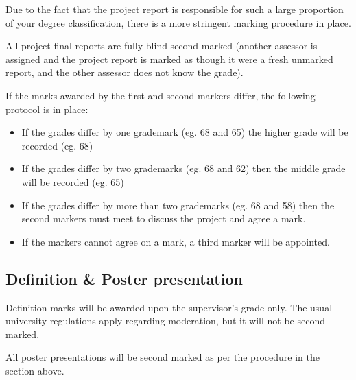 Due to the fact that the project report is responsible for such a large proportion of your degree classification, there is a more stringent marking procedure in place.

All project final reports are fully blind second marked (another assessor is assigned and the project report is marked as though it were a fresh unmarked report, and the other assessor does not know the grade).

If the marks awarded by the first and second markers differ, the following protocol is in place:

\begin{itemize}
    \item If the grades differ by one grademark (eg. 68 and 65) the higher grade will be recorded (eg. 68)
    \item If the grades differ by two grademarks (eg. 68 and 62) then the middle grade will be recorded (eg. 65)
    \item If the grades differ by more than two grademarks (eg. 68 and 58) then the second markers must meet to discuss the project and agree a mark.
    \item If the markers cannot agree on a mark, a third marker will be appointed.
\end{itemize}

\subsection{Definition \& Poster presentation}

Definition marks will be awarded upon the supervisor's grade only. The usual university regulations apply regarding moderation, but it will not be second marked.

All poster presentations will be second marked as per the procedure in the section above.
